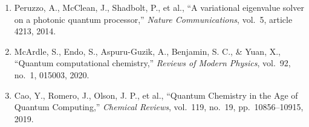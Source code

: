 \documentclass[11pt]{article}
\begin{document}
\begin{enumerate}
    \item Peruzzo, A., McClean, J., Shadbolt, P., et al., ``A variational eigenvalue solver on a photonic quantum processor,'' \textit{Nature Communications}, vol.\ 5, article 4213, 2014.
    \item McArdle, S., Endo, S., Aspuru-Guzik, A., Benjamin, S. C., \& Yuan, X., ``Quantum computational chemistry,'' \textit{Reviews of Modern Physics}, vol.\ 92, no.\ 1, 015003, 2020.
    \item Cao, Y., Romero, J., Olson, J. P., et al., ``Quantum Chemistry in the Age of Quantum Computing,'' \textit{Chemical Reviews}, vol.\ 119, no.\ 19, pp.\ 10856--10915, 2019.
\end{enumerate}

\end{document}
